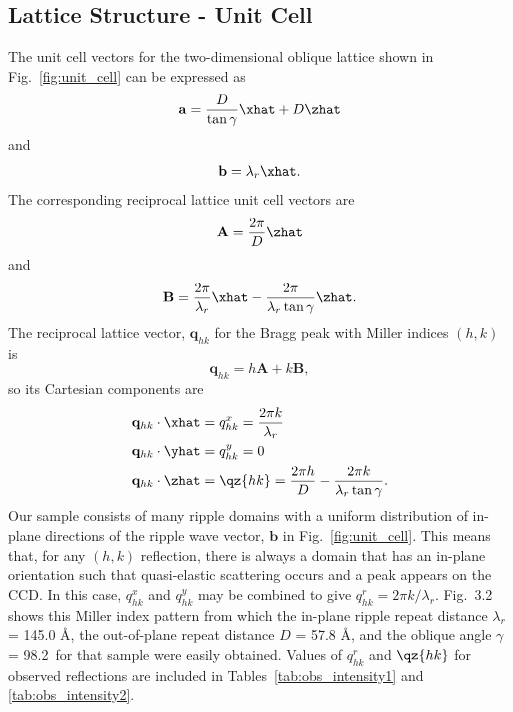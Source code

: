 \subsection{Lattice Structure - Unit Cell}\label{sec:lattice_structure}
The unit cell vectors for the two-dimensional oblique lattice shown in Fig.~\ref{fig:unit_cell}
can be expressed as 
\begin{equation}
  \mathbf{a} = \frac{D}{\tan\gamma}\xhat + D\zhat
\end{equation}
and
\begin{equation}
  \mathbf{b} = \lambda_r\xhat.
\end{equation}
The corresponding reciprocal lattice unit cell vectors are
\begin{equation}
  \mathbf{A} = \frac{2\pi}{D}\zhat
\end{equation}
and
\begin{equation}
  \mathbf{B} = \frac{2\pi}{\lambda_r}\xhat - \frac{2\pi}{\lambda_r\tan\gamma}\zhat.
\end{equation}
The reciprocal lattice vector, $\mathbf{q}_{hk}$ for the Bragg peak with 
Miller indices $(h,k)$ is 
\begin{equation}
  \mathbf{q}_{hk}=h\mathbf{A}+k\mathbf{B},
\end{equation}
so its Cartesian components are
\begin{align}
  & \mathbf{q}_{hk}\cdot\xhat = q_{hk}^x = \frac{2\pi k}{\lambda_r}\\
  & \mathbf{q}_{hk}\cdot\yhat = q_{hk}^y = 0 \\
  & \mathbf{q}_{hk}\cdot\zhat = \qz{hk} = \frac{2\pi h}{D} - \frac{2\pi k}{\lambda_r\tan\gamma}.
\end{align}
Our sample consists of many ripple domains with a uniform distribution of 
in-plane directions of the
ripple wave vector, $\mathbf{b}$ in Fig.~\ref{fig:unit_cell}. 
This means that, for any $(h,k)$ reflection, there is always a domain that has 
an in-plane orientation such that quasi-elastic scattering occurs and a peak 
appears on the CCD.  
In this case, $q_{hk}^x$ and $q_{hk}^y$ may be combined to 
give $q_{hk}^r = 2\pi k/\lambda_r$.  
Fig.~3.2 shows this Miller index pattern from which the in-plane ripple repeat 
distance $\lambda_r$ = 145.0 \AA, the out-of-plane repeat distance 
$D$ = 57.8 \AA, and the oblique angle $\gamma$ = 98.2\textdegree\ for that 
sample were easily obtained.
Values of $q_{hk}^r$ and $\qz{hk}$ for observed reflections are included
in Tables~\ref{tab:obs_intensity1} and \ref{tab:obs_intensity2}.

